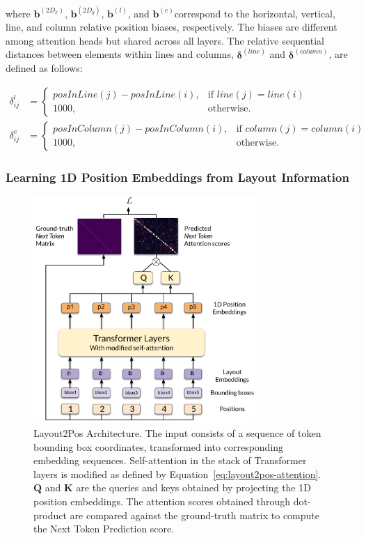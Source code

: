 \noindent where $\bm{b}^{(2D_x)}$, $\bm{b}^{(2D_y)}$, $\bm{b}^{(l)}$, and $\bm{b}^{(c)}$correspond to the horizontal, vertical, line, and column relative position biases, respectively. The biases are different among attention heads but shared across all layers. The relative sequential distances between elements within lines and columns, $\bm{\delta}^{(line)}$ and $\bm{\delta}^{(column)}$, are defined as follows:

\begin{equation}
  \begin{split}
    \delta^{l}_{ij} &= 
        \begin{cases}
          posInLine(j) - posInLine(i), & \text{if } line(j) = line(i)\\
            1000,              & \text{otherwise}.
        \end{cases} \\
    \delta^{c}_{ij} &= 
      \begin{cases}
        posInColumn(j) - posInColumn(i), & \text{if } column(j) = column(i)\\
          1000,              & \text{otherwise}.
      \end{cases}
  \end{split}
\end{equation}

\subsubsection{Learning 1D Position Embeddings from Layout Information}

\begin{figure}[h]
  \centering
  \includegraphics[width=0.75\textwidth]{images/chapter4/Layout2Pos.pdf}
  \caption{Layout2Pos Architecture. The input consists of a sequence of token bounding box coordinates, transformed into corresponding embedding sequences. Self-attention in the stack of Transformer layers is modified as defined by Equation~\ref{eq:layout2pos-attention}. $\bm{Q}$ and $\bm{K}$ are the queries and keys obtained by projecting the 1D position embeddings. The attention scores obtained through dot-product are compared against the ground-truth matrix to compute the Next Token Prediction score.}
\end{figure}

